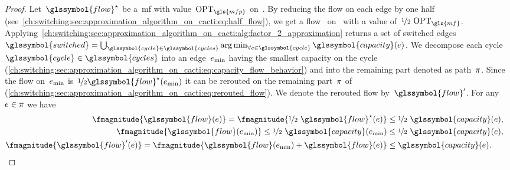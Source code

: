\begin{proof}
Let~$\glssymbol{flow}^\star$ be a~\gls{mf} with value~$\opt_{\gls{mfp}}$
on~. By reducing the flow on each edge by one half
(see~\cref{ch:switching:sec:approximation_algorithm_on_cacti:eq:half_flow}), we
get a flow~ on~ with a value of~$\nicefrac{1}
{2}~\opt_{\gls{mf}}$.
Applying~\cref{ch:switching:sec:approximation_algorithm_on_cacti:alg:factor_2_approximation}
% 
returns a set of switched edges~$\glssymbol{switched} =
\bigcup_{\glssymbol{cycle}\in\glssymbol{cycles}}
\argmin_{\forall\edge\in\glssymbol{cycle}}\glssymbol{capacity} (\edge)$.
% 
We decompose each cycle~$\glssymbol{cycle}\in\glssymbol{cycles}$ into an
edge~$e_{\min}$ having the smallest capacity on the cycle~
(\cref{ch:switching:sec:approximation_algorithm_on_cacti:eq:capacity_flow_behavior})
and into the remaining part denoted as path~$\pi$. Since the flow
on~$e_{\min}$ is~$\nicefrac{1}{2}\glssymbol{flow}^\star(\edge_{\min})$ it
can be rerouted on the remaining part~$\pi$ of~
(\cref{ch:switching:sec:approximation_algorithm_on_cacti:eq:rerouted_flow}). We
denote the rerouted flow by~$\glssymbol{flow}'$. For any~$e\in\pi$ we
have
%
\begin{align}
  \fmagnitude{\glssymbol{flow}(\edge)} = 
  \fmagnitude{\nicefrac{1}{2}~\glssymbol{flow}^\star(\edge)}&
  \leq\nicefrac{1}{2}~\glssymbol{capacity}(\edge),& 
  \label{ch:switching:sec:approximation_algorithm_on_cacti:eq:half_flow}\\
  \fmagnitude{\glssymbol{flow}(\edge_{\min})}
  \leq\nicefrac{1}{2}~\glssymbol{capacity}(\edge_{\min}) &\leq
  \nicefrac{1}{2}~\glssymbol{capacity}(\edge),&
  \label{ch:switching:sec:approximation_algorithm_on_cacti:eq:capacity_flow_behavior} 
  \\
  \fmagnitude{\glssymbol{flow}'(\edge)} =
  \fmagnitude{\glssymbol{flow}(\edge_{\min}) + 
  \glssymbol{flow}(\edge)}&\leq\glssymbol{capacity}(\edge).&
  \label{ch:switching:sec:approximation_algorithm_on_cacti:eq:rerouted_flow}
\end{align}
% 
\end{proof}
%
% 
\begingroup
